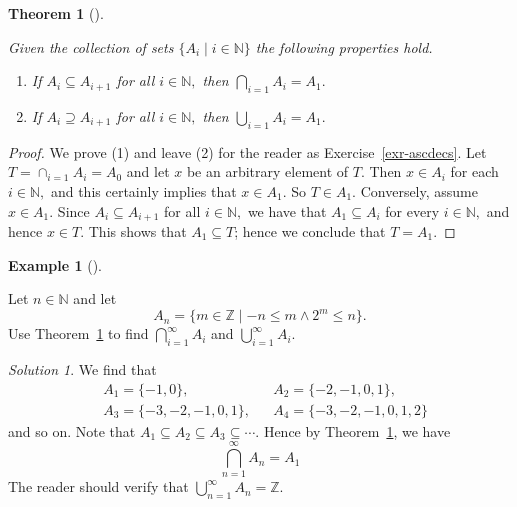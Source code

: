 \documentclass[
  letterpaper,
  10pt,
  reqno,
  twopage,
  openany]{book}
\providecommand{\tightlist}{%
  \setlength{\itemsep}{0pt}\setlength{\parskip}{0pt}}\usepackage{longtable,booktabs,array}
\theoremstyle{plain}
\theoremstyle{definition}
\theoremstyle{definition}
\theoremstyle{definition}
\newtheorem{example}{Example}[chapter]
\theoremstyle{plain}
\theoremstyle{plain}
\newtheorem{theorem}{Theorem}[chapter]
\theoremstyle{remark}
\newtheorem*{solution}{Solution}
\begin{document}
\leavevmode{}%
\begin{theorem}[]\label{thm-ascdecs}

Given the collection of sets \(\{A_i \mid i\in \mathbb{N}\}\) the
following properties hold.

\begin{enumerate}
\def\labelenumi{\arabic{enumi}.}
\tightlist
\item
  If \(A_i \subseteq A_{i+1}\) for all \(i\in \mathbb{N},\) then
  \(\bigcap_{i=1}A_i=A_1.\)
\item
  If \(A_i \supseteq A_{i+1}\) for all \(i\in \mathbb{N},\) then
  \(\bigcup_{i=1}A_i=A_1.\)
\end{enumerate}

\end{theorem}

\begin{proof}

We prove (1) and leave (2) for the reader as Exercise~\ref{exr-ascdecs}.
Let \(T=\cap_{i=1}A_i=A_0\) and let \(x\) be an arbitrary element of
\(T.\) Then \(x\in A_i\) for each \(i\in \mathbb{N},\) and this
certainly implies that \(x\in A_1.\) So \(T\in A_1.\) Conversely, assume
\(x\in A_1.\) Since \(A_i \subseteq A_{i+1}\) for all
\(i\in \mathbb{N},\) we have that \(A_1\subseteq A_i\) for every
\(i\in \mathbb{N},\) and hence \(x\in T.\) This shows that
\(A_1\subseteq T\); hence we conclude that \(T=A_1.\)

\end{proof}

\leavevmode{}%
\begin{example}[]\label{exm-ascdecs}

Let \(n\in \mathbb{N}\) and let \[
A_n=\{m\in \mathbb{Z} \mid -n \leq m \land 2^m\leq n\}.
\] Use Theorem~\ref{thm-ascdecs} to find \(\bigcap_{i=1}^{\infty} A_i\)
and \(\bigcup_{i=1}^{\infty} A_i.\)

\end{example}

\begin{solution}

We find that \begin{align*}
& A_1=\{-1,0\},  
& & A_2=\{-2,-1,0,1\}, \\
& A_3=\{-3,-2,-1,0,1\}, 
& & A_4=\{-3,-2,-1,0,1,2\} 
\end{align*} and so on. Note that
\(A_1\subseteq A_2 \subseteq A_3 \subseteq \cdots.\) Hence by
Theorem~\ref{thm-ascdecs}, we have \[
\bigcap_{n=1}^\infty A_n=A_1
\] The reader should verify that
\(\bigcup_{n=1}^\infty A_n=\mathbb{Z}.\)

\end{solution}
\end{document}

